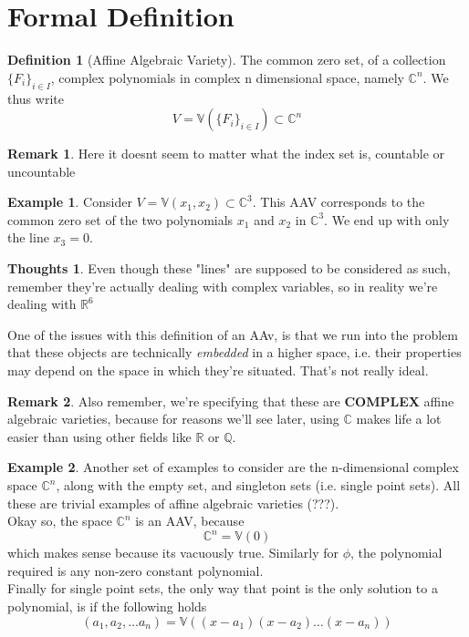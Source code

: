 \documentclass[12pt]{book}
\theoremstyle{definition}
\newtheorem*{defn}{Definition}
\newtheorem{eg}{Example}[chapter]
\newtheorem*{huh}{Thoughts}
\newtheorem*{rem}{Remark}
\begin{document}
\section{Formal Definition}
\begin{defn}[Affine Algebraic Variety]
The common zero set, of a collection $\{F_i\}_{i\in I}$, complex polynomials in complex n dimensional space, namely $\mathbb{C}^n$. We thus write 
$$V = \mathbb{V}(\{F_i\}_{i \in I}) \subset \mathbb{C}^n$$
\end{defn}
\begin{rem} Here it doesnt seem to matter what the index set is, countable or uncountable
\end{rem}
\begin{eg}Consider $V = \mathbb{V}(x_1, x_2) \subset \mathbb{C}^3$. This AAV corresponds to the common zero set of the two polynomials $x_1$ and $x_2$ in $\mathbb{C}^3$. We end up with only the line $x_3 = 0$. 
\begin{huh}Even though these "lines" are supposed to be considered as such, remember they're actually dealing with complex variables, so in reality we're dealing with $\mathbb{R}^6$\end{huh}
\end{eg}
One of the issues with this definition of an AAv, is that we run into the problem that these objects are technically \textit{embedded} in a higher space, i.e. their properties may depend on the space in which they're situated. That's not really ideal.
\begin{rem}
Also remember, we're specifying that these are \textbf{COMPLEX} affine algebraic varieties, because for reasons we'll see later, using $\mathbb{C}$ makes life a lot easier than using other fields like $\mathbb{R}$ or $\mathbb{Q}$.
\end{rem}
\begin{eg}
Another set of examples to consider are the n-dimensional complex space $\mathbb{C}^n$, along with the empty set, and singleton sets (i.e. single point sets). All these are trivial examples of affine algebraic varieties (???).\\
Okay so, the space $\mathbb{C}^n$ is an AAV, because $$\mathbb{C}^n = \mathbb{V}(0)$$
which makes sense because its vacuously true. Similarly for $\phi$, the polynomial required is any non-zero constant polynomial.\\
Finally for single point sets, the only way that point is the only solution to a polynomial, is if the following holds
$$(a_1, a_2, \ldots a_n) = \mathbb{V}((x-a_1)(x-a_2)\ldots(x-a_n))$$
\end{eg}
\end{document}
